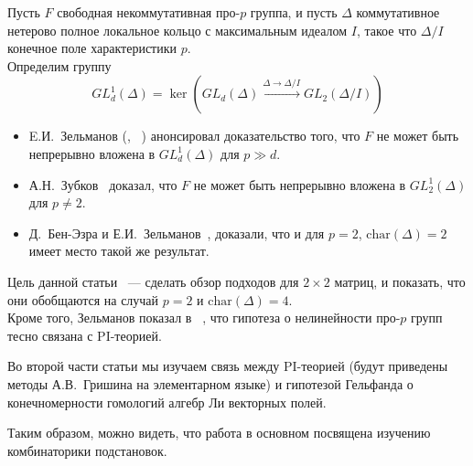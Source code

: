 \noindent
Пусть $F$ свободная некоммутативная про-$p$ группа, и пусть $\Delta$ коммутативное нетерово полное локальное кольцо с максимальным идеалом $I$, такое что
$\Delta/I$ конечное поле характеристики $p$.\\
Определим группу
\[GL_d^1(\Delta) = \ker\left( GL_d(\Delta) \xrightarrow{\Delta\to\Delta/I} GL_2(\Delta/I) \right)\]
\begin{itemize}
    \item E.И.\ Зельманов (\cite{Zelmanov1}, ~\cite{Zelmanov2}) анонсировал доказательство того, что $F$ не может быть непрерывно вложена в $GL_d^1(\Delta)$ для $p\gg d$.
    \item А.Н.\ Зубков~\cite{Zubkov} доказал, что $F$ не может быть непрерывно вложена в $GL_2^1(\Delta)$ для $p\neq2$.
    \item Д.\ Бен-Эзра и Е.И.\ Зельманов~\cite{Ben-Ezra-Zelmanov}, доказали, что и для $p=2$, $\mathrm{char}(\Delta)=2$ имеет место такой же результат.
\end{itemize}

Цель данной статьи ~--- сделать обзор подходов для $2\times2$ матриц, и показать, что они обобщаются на случай $p=2$ и $\mathrm{char}(\Delta)=4$.\\
Кроме того, Зельманов показал в ~\cite{Zelmanov1}, что гипотеза о нелинейности про-$p$ групп тесно связана с PI-теорией.

Во второй части статьи мы изучаем связь между PI-теорией (будут приведены методы А.В.\ Гришина на элементарном языке)
и гипотезой Гельфанда о конечномерности гомологий алгебр Ли векторных полей.

Таким образом, можно видеть, что работа в основном посвящена изучению комбинаторики подстановок.